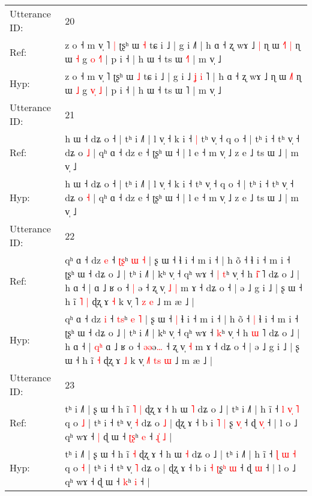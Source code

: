 \documentclass[10pt]{article}
\DeclareRobustCommand{\hl}[1]{{\textcolor{red}{#1}}}
\begin{document}
\begin{longtable}{ll}
\midrule
Utterance ID: & 20 \\
Ref: & z o ˧ m v̩ ˥\hl{ }\hl{|} ʈʂʰ ɯ \hl{˧} tɕ i ˩ | g i ˩\hl{}\hl{}\hl{}\hl{}\hl{}˥ | h ɑ ˧ ʐ wɤ ˩\hl{ }\hl{|} ɳ ɯ \hl{˧}˥\hl{ }\hl{|} ɳ ɯ \hl{˧} g \hl{o}\hl{ }\hl{˧}\hl{˥} | p i ˧ | h ɯ ˧ ts ɯ \hl{˧}˥ | m v̩ ˩
 \\
Hyp: & z o ˧ m v̩ ˥\hl{}\hl{} ʈʂʰ ɯ \hl{˩} tɕ i ˩ | g i ˩\hl{ }\hl{ʝ}\hl{ }\hl{i}\hl{ }˥ | h ɑ ˧ ʐ wɤ ˩\hl{}\hl{} ɳ ɯ \hl{˩}˥\hl{}\hl{} ɳ ɯ \hl{˩} g \hl{v}\hl{̩}\hl{ }\hl{˩} | p i ˧ | h ɯ ˧ ts ɯ \hl{}˥ | m v̩ ˩
 \\
\midrule
Utterance ID: & 21 \\
Ref: & h ɯ ˧ dʑ o ˧ | tʰ i ˩˥ | l v̩ ˧ k i ˧\hl{ }\hl{|} tʰ v̩ ˧ q o ˧ | tʰ i ˧ tʰ v̩ ˧ dʑ o \hl{˩} | qʰ ɑ ˧ dz e ˧ ʈʂʰ ɯ ˧ | l e ˧ m v̩ ˩ z e ˩ ts ɯ ˩ | m v̩ ˩
 \\
Hyp: & h ɯ ˧ dʑ o ˧ | tʰ i ˩˥ | l v̩ ˧ k i ˧\hl{}\hl{} tʰ v̩ ˧ q o ˧ | tʰ i ˧ tʰ v̩ ˧ dʑ o \hl{˧} | qʰ ɑ ˧ dz e ˧ ʈʂʰ ɯ ˧ | l e ˧ m v̩ ˩ z e ˩ ts ɯ ˩ | m v̩ ˩
 \\
\midrule
Utterance ID: & 22 \\
Ref: & qʰ ɑ ˧ dz \hl{e} ˧ \hl{ʈ}\hl{ʂ}ʰ \hl{ɯ} \hl{˧} | ʂ ɯ ˧\hl{}\hl{} ɬ i ˧ m i ˧ | h õ ˧\hl{}\hl{} ɬ i ˧ m i ˧ ʈʂʰ ɯ ˧ dʑ o ˩ | tʰ i ˩˥ | kʰ v̩ ˧ qʰ wɤ ˧\hl{ }\hl{|} \hl{t}ʰ v̩ ˧ h \hl{i}\hl{͂} ˥ dʑ o ˩ | h ɑ ˧ |\hl{}\hl{}\hl{} ɑ ˩ ʁ o ˧ \hl{|}\hl{ }ə\hl{} ˧ ʐ v̩\hl{ }\hl{˩} \hl{|} m ɤ ˧ dʑ o ˧ | ə ˩ g i ˩ | ʂ ɯ ˧ h ĩ\hl{ }\hl{˥} \hl{|} ɖʐ ɤ \hl{˧} k v̩ \hl{}˥ \hl{}\hl{z} \hl{e} ˩ m æ ˩ |
 \\
Hyp: & qʰ ɑ ˧ dz \hl{i} ˧ \hl{t}\hl{s}ʰ \hl{e} \hl{˥} | ʂ ɯ ˧\hl{ }\hl{|} ɬ i ˧ m i ˧ | h õ ˧\hl{ }\hl{|} ɬ i ˧ m i ˧ ʈʂʰ ɯ ˧ dʑ o ˩ | tʰ i ˩˥ | kʰ v̩ ˧ qʰ wɤ ˧\hl{}\hl{} \hl{k}ʰ v̩ ˧ h \hl{}\hl{ɯ} ˥ dʑ o ˩ | h ɑ ˧ |\hl{ }\hl{q}\hl{ʰ} ɑ ˩ ʁ o ˧ \hl{ə}\hl{ə}ə\hl{…} ˧ ʐ v̩\hl{}\hl{} \hl{˧} m ɤ ˧ dʑ o ˧ | ə ˩ g i ˩ | ʂ ɯ ˧ h ĩ\hl{}\hl{} \hl{˧} ɖʐ ɤ \hl{˩} k v̩ \hl{˩}˥ \hl{t}\hl{s} \hl{ɯ} ˩ m æ ˩ |
 \\
\midrule
Utterance ID: & 23 \\
Ref: & tʰ i ˩˥ | ʂ ɯ ˧ h ĩ\hl{ }\hl{˥} \hl{|} ɖʐ ɤ ˧ h ɯ \hl{˥} dʑ o ˩ | tʰ i ˩˥ | h ĩ ˧ \hl{l} \hl{v}\hl{̩} \hl{˥} q o \hl{˩} | tʰ i ˧ tʰ v̩ \hl{˧} dʑ o\hl{ }\hl{˩} | ɖʐ ɤ ˧ b i \hl{˥} \hl{|}\hl{ }ʂ\hl{ }\hl{v}\hl{̩} ˧ ɖ \hl{v}\hl{̩} ˧ | l o ˩ qʰ wɤ ˧\hl{ }\hl{|} ɖ ɯ ˧ \hl{ʈ}\hl{ʂ}ʰ \hl{e} ˧\hl{ }\hl{ɻ}\hl{̍}\hl{ }\hl{˩} |
 \\
Hyp: & tʰ i ˩˥ | ʂ ɯ ˧ h ĩ\hl{}\hl{} \hl{˧} ɖʐ ɤ ˧ h ɯ \hl{˧} dʑ o ˩ | tʰ i ˩˥ | h ĩ ˧ \hl{ɭ} \hl{}\hl{ɯ} \hl{˧} q o \hl{˧} | tʰ i ˧ tʰ v̩ \hl{˥} dʑ o\hl{}\hl{} | ɖʐ ɤ ˧ b i \hl{˧} \hl{}\hl{ʈ}ʂ\hl{ʰ}\hl{ }\hl{ɯ} ˧ ɖ \hl{}\hl{ɯ} ˧ | l o ˩ qʰ wɤ ˧\hl{}\hl{} ɖ ɯ ˧ \hl{}\hl{k}ʰ \hl{i} ˧\hl{}\hl{}\hl{}\hl{}\hl{} |

\end{longtable}
\end{document}
